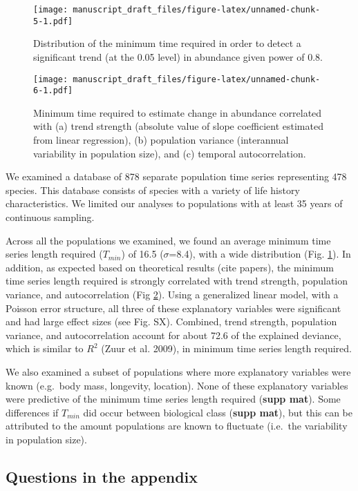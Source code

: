 \documentclass[12pt,]{article}
\begin{document}
\begin{figure}[htbp]
\centering
\texttt{[image: manuscript\_draft\_files/figure-latex/unnamed-chunk-5-1.pdf]}
\caption{Distribution of the minimum time required in order to detect a
significant trend (at the 0.05 level) in abundance given power of
0.8.\label{fig:min_time_dist}}
\end{figure}

\begin{figure}[htbp]
\centering
\texttt{[image: manuscript\_draft\_files/figure-latex/unnamed-chunk-6-1.pdf]}
\caption{Minimum time required to estimate change in abundance
correlated with (a) trend strength (absolute value of slope coefficient
estimated from linear regression), (b) population variance (interannual
variability in population size), and (c) temporal
autocorrelation.\label{fig:correlates}}
\end{figure}

We examined a database of 878 separate population time series
representing 478 species. This database consists of species with a
variety of life history characteristics. We limited our analyses to
populations with at least 35 years of continuous sampling.

Across all the populations we examined, we found an average minimum time
series length required (\(T_{min}\)) of 16.5 (\(\sigma\)=8.4), with a
wide distribution (Fig. \ref{fig:min_time_dist}). In addition, as
expected based on theoretical results (cite papers), the minimum time
series length required is strongly correlated with trend strength,
population variance, and autocorrelation (Fig \ref{fig:correlates}).
Using a generalized linear model, with a Poisson error structure, all
three of these explanatory variables were significant and had large
effect sizes (see Fig. SX). Combined, trend strength, population
variance, and autocorrelation account for about 72.6 of the explained
deviance, which is similar to \(R^2\) (Zuur et al. 2009), in minimum
time series length required.

We also examined a subset of populations where more explanatory
variables were known (e.g.~body mass, longevity, location). None of
these explanatory variables were predictive of the minimum time series
length required (\textbf{supp mat}). Some differences if \(T_{min}\) did
occur between biological class (\textbf{supp mat}), but this can be
attributed to the amount populations are known to fluctuate (i.e.~the
variability in population size).

\subsection{Questions in the appendix}\label{questions-in-the-appendix}
\end{document}
